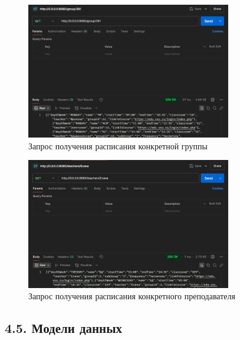 \documentclass{vsureport}
\begin{document}
\begin{figure}[H]
	\centering
	\includegraphics[width=0.8\textwidth]{4.png}
	\caption{Запрос получения расписания конкретной группы}
	\label{fig:fig4}
\end{figure}

\begin{figure}[H]
	\centering
	\includegraphics[width=0.8\textwidth]{5.png}
	\caption{Запрос получения расписания конкретного преподавателя}
	\label{fig:fig5}
\end{figure} 

\subsection*{4.5. Модели данных}
\end{document}
